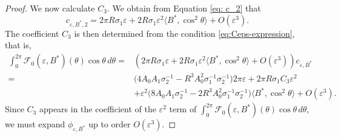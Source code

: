 \documentclass[12pt,reqno]{amsart}
\numberwithin{equation}{section}
\theoremstyle{definition}
\theoremstyle{remark}
\begin{document}
\begin{proof}
We now calculate $ C_3 $. We obtain from Equation \eqref{eq: c_2} that
\begin{equation*} 
c_{\varepsilon,B^*,2}=   2\pi R\sigma_1\varepsilon +2R\sigma_1\varepsilon^2\langle B^*  , \cos^2\theta\rangle
+ O(\varepsilon^3).
\end{equation*}
The coefficient $C_3$ is then determined from   the condition \eqref{eq:Ceps-expression}, that is, 
\begin{equation}\label{eq:C3-integral}
\begin{split}
\int_0^{2\pi}\mathcal F_0(\varepsilon,B^*)(\theta)\cos\theta\, d\theta=&\left (2\pi R\sigma_1\varepsilon +2R\sigma_1\varepsilon^2\langle B^*  , \cos^2\theta\rangle
+ O(\varepsilon^3)\right )c_{\varepsilon,B^*}  
 \\
=&\bigl(4A_0A_1\sigma_2^{-1}-R^3A_0^2\sigma_1^{-1}\sigma_2^{-1}\bigr)2\pi\varepsilon+2\pi R\sigma_1C_3\varepsilon^2 \\
&+\varepsilon^2\bigl(8A_0A_1\sigma_2^{-1}-2R^3A_0^2\sigma_1^{-1}\sigma_2^{-1}\bigr)\langle B^*  , \cos^2\theta\rangle
+O(\varepsilon^3).
\end{split}
\end{equation}
Since $C_3$ appears in the coefficient of the $\varepsilon^2$ term of $ \int_0^{2\pi}\mathcal F_0(\varepsilon,B^*)(\theta)\cos\theta\, d\theta $, we must expand $\phi_{\varepsilon,B^*}$ up to order $O(\varepsilon^3)$.   


\end{proof}
\end{document}
